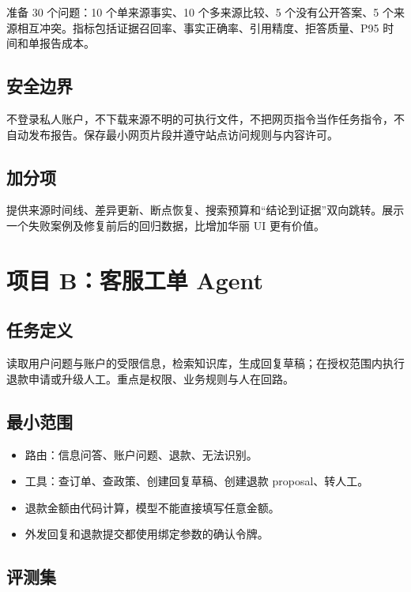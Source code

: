 准备 30 个问题：10 个单来源事实、10 个多来源比较、5 个没有公开答案、5 个来源相互冲突。指标包括证据召回率、事实正确率、引用精度、拒答质量、P95 时间和单报告成本。

\subsection{安全边界}

不登录私人账户，不下载来源不明的可执行文件，不把网页指令当作任务指令，不自动发布报告。保存最小网页片段并遵守站点访问规则与内容许可。

\subsection{加分项}

提供来源时间线、差异更新、断点恢复、搜索预算和“结论到证据”双向跳转。展示一个失败案例及修复前后的回归数据，比增加华丽 UI 更有价值。

\section{项目 B：客服工单 Agent}

\subsection{任务定义}

读取用户问题与账户的受限信息，检索知识库，生成回复草稿；在授权范围内执行退款申请或升级人工。重点是权限、业务规则与人在回路。

\subsection{最小范围}

\begin{itemize}
  \item 路由：信息问答、账户问题、退款、无法识别。
  \item 工具：查订单、查政策、创建回复草稿、创建退款 proposal、转人工。
  \item 退款金额由代码计算，模型不能直接填写任意金额。
  \item 外发回复和退款提交都使用绑定参数的确认令牌。
\end{itemize}

\subsection{评测集}

